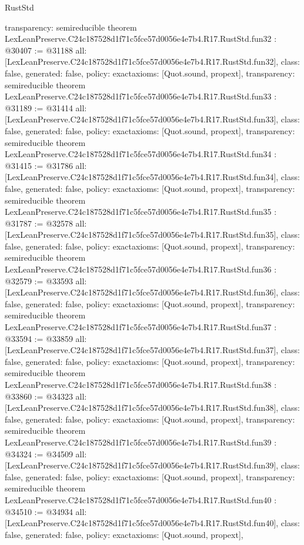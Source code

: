 \begin{lexlean}{RustStd}
\begin{coremodule}
{  transparency: semireducible
}
theorem LexLeanPreserve.C24c187528d1f71c5fce57d0056e4e7b4.R17.RustStd.fun32 : @30407 := @31188 {
  all: [LexLeanPreserve.C24c187528d1f71c5fce57d0056e4e7b4.R17.RustStd.fun32],
  class: false,
  generated: false,
  policy: exact{axioms: [Quot.sound, propext]},
  transparency: semireducible
}
theorem LexLeanPreserve.C24c187528d1f71c5fce57d0056e4e7b4.R17.RustStd.fun33 : @31189 := @31414 {
  all: [LexLeanPreserve.C24c187528d1f71c5fce57d0056e4e7b4.R17.RustStd.fun33],
  class: false,
  generated: false,
  policy: exact{axioms: [Quot.sound, propext]},
  transparency: semireducible
}
theorem LexLeanPreserve.C24c187528d1f71c5fce57d0056e4e7b4.R17.RustStd.fun34 : @31415 := @31786 {
  all: [LexLeanPreserve.C24c187528d1f71c5fce57d0056e4e7b4.R17.RustStd.fun34],
  class: false,
  generated: false,
  policy: exact{axioms: [Quot.sound, propext]},
  transparency: semireducible
}
theorem LexLeanPreserve.C24c187528d1f71c5fce57d0056e4e7b4.R17.RustStd.fun35 : @31787 := @32578 {
  all: [LexLeanPreserve.C24c187528d1f71c5fce57d0056e4e7b4.R17.RustStd.fun35],
  class: false,
  generated: false,
  policy: exact{axioms: [Quot.sound, propext]},
  transparency: semireducible
}
theorem LexLeanPreserve.C24c187528d1f71c5fce57d0056e4e7b4.R17.RustStd.fun36 : @32579 := @33593 {
  all: [LexLeanPreserve.C24c187528d1f71c5fce57d0056e4e7b4.R17.RustStd.fun36],
  class: false,
  generated: false,
  policy: exact{axioms: [Quot.sound, propext]},
  transparency: semireducible
}
theorem LexLeanPreserve.C24c187528d1f71c5fce57d0056e4e7b4.R17.RustStd.fun37 : @33594 := @33859 {
  all: [LexLeanPreserve.C24c187528d1f71c5fce57d0056e4e7b4.R17.RustStd.fun37],
  class: false,
  generated: false,
  policy: exact{axioms: [Quot.sound, propext]},
  transparency: semireducible
}
theorem LexLeanPreserve.C24c187528d1f71c5fce57d0056e4e7b4.R17.RustStd.fun38 : @33860 := @34323 {
  all: [LexLeanPreserve.C24c187528d1f71c5fce57d0056e4e7b4.R17.RustStd.fun38],
  class: false,
  generated: false,
  policy: exact{axioms: [Quot.sound, propext]},
  transparency: semireducible
}
theorem LexLeanPreserve.C24c187528d1f71c5fce57d0056e4e7b4.R17.RustStd.fun39 : @34324 := @34509 {
  all: [LexLeanPreserve.C24c187528d1f71c5fce57d0056e4e7b4.R17.RustStd.fun39],
  class: false,
  generated: false,
  policy: exact{axioms: [Quot.sound, propext]},
  transparency: semireducible
}
theorem LexLeanPreserve.C24c187528d1f71c5fce57d0056e4e7b4.R17.RustStd.fun40 : @34510 := @34934 {
  all: [LexLeanPreserve.C24c187528d1f71c5fce57d0056e4e7b4.R17.RustStd.fun40],
  class: false,
  generated: false,
  policy: exact{axioms: [Quot.sound, propext]},
}
\end{coremodule}
\end{lexlean}
